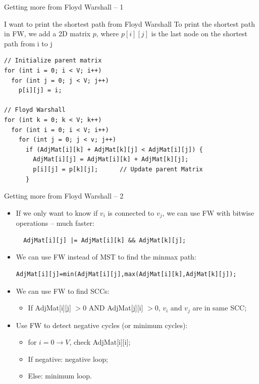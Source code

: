 \begin{frame}[fragile]{Getting more from Floyd Warshall -- 1}
  \begin{block}{I want to print the shortest path from Floyd Warshall}
To print the shortest path in FW, we add a 2D matrix $p$, where $p[i][j]$ is the last node on the shortest path from i to j
{\smaller
\begin{verbatim}
// Initialize parent matrix
for (int i = 0; i < V; i++)
  for (int j = 0; j < V; j++)
    p[i][j] = i;

// Floyd Warshall
for (int k = 0; k < V; k++)
  for (int i = 0; i < V; i++)
    for (int j = 0; j < v; j++)
      if (AdjMat[i][k] + AdjMat[k][j] < AdjMat[i][j]) {
        AdjMat[i][j] = AdjMat[i][k] + AdjMat[k][j];
        p[i][j] = p[k][j];      // Update parent Matrix
      }
\end{verbatim}}
  \end{block}
\end{frame}


\begin{frame}[fragile]{Getting more from Floyd Warshall -- 2}

  \begin{itemize}
  \item If we only want to know if $v_i$ is connected to $v_j$, we can use FW with bitwise operations -- much faster:
  \begin{verbatim}
  AdjMat[i][j] |= AdjMat[i][k] && AdjMat[k][j];
  \end{verbatim}

  \item We can use FW instead of MST to find the minmax path:
  {\smaller\begin{verbatim}
AdjMat[i][j]=min(AdjMat[i][j],max(AdjMat[i][k],AdjMat[k][j]);
\end{verbatim}}\medskip

  \item We can use FW to find SCCs:
  \begin{itemize}
    \item If AdjMat[i][j] $> 0$ AND AdjMat[j][i] $> 0$, $v_i$ and $v_j$ are in same SCC;
  \end{itemize}\medskip

  \item Use FW to detect negative cycles (or minimum cycles):
  \begin{itemize}
    \item for $i = 0\to V$, check AdjMat[i][i];
    \item If negative: negative loop;
    \item Else: minimum loop.
  \end{itemize}
  \end{itemize}
\end{frame}

